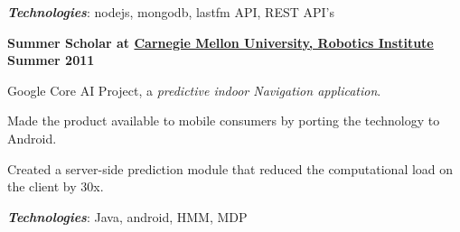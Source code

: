 \documentclass[10pt]{article}
\renewcommand{\section}[2]%
            {\pagebreak[2]\vspace{1.3\baselineskip}%
             \phantomsection\addcontentsline{toc}{section}{#1}%
             \hspace{0in}%
             \marginpar{
             \raggedright \scshape #1}#2}
\newenvironment{outerlist}[1][\enskip\textbullet]%
            {\begin{itemize}[#1]}{\end{itemize}%
             \vspace{-.6\baselineskip}}
\newenvironment{innerlist}[1][\enskip\textbullet]%
            {\begin{compactitem}[#1]}{\end{compactitem}}
\newcommand{\blankline}{\quad\pagebreak[2]}
\begin{document}
    
    \vspace{0.2cm}
    \hspace{0.25cm}\textbf{\textit{Technologies}}: 
    nodejs, mongodb, lastfm API, REST API's
    
    \vspace{0.4cm}
    
    \textbf{Summer Scholar at \href{http://www.ri.cmu.edu/}{Carnegie Mellon University, Robotics Institute}}
    \hfill \textbf{Summer 2011}
    \vspace{0.1cm}
    
    Google Core AI Project, a \textit{predictive indoor Navigation application}.
    
    \vspace{0.1cm}
    \begin{innerlist}
    \item Made the product available to mobile consumers by porting the technology to Android.
    \item Created a server-side prediction module that reduced the computational load on the client by 30x.
    \end{innerlist}
    
    \vspace{0.2cm}
    \hspace{0.25cm}\textbf{\textit{Technologies}}: 
    Java, android, HMM, MDP
    
    
    
    
    
    \vspace{-0.1cm}
    
\end{document}
